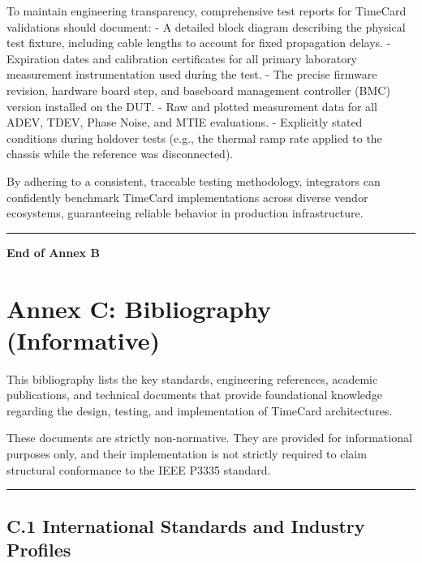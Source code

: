 To maintain engineering transparency, comprehensive test reports for
TimeCard validations should document: - A detailed block diagram
describing the physical test fixture, including cable lengths to account
for fixed propagation delays. - Expiration dates and calibration
certificates for all primary laboratory measurement instrumentation used
during the test. - The precise firmware revision, hardware board step,
and baseboard management controller (BMC) version installed on the DUT.
- Raw and plotted measurement data for all ADEV, TDEV, Phase Noise, and
MTIE evaluations. - Explicitly stated conditions during holdover tests
(e.g., the thermal ramp rate applied to the chassis while the reference
was disconnected).

By adhering to a consistent, traceable testing methodology, integrators
can confidently benchmark TimeCard implementations across diverse vendor
ecosystems, guaranteeing reliable behavior in production infrastructure.

\begin{center}\rule{0.5\linewidth}{0.5pt}\end{center}

\textbf{End of Annex B}

\section{Annex C: Bibliography
(Informative)}\label{annex-c-bibliography-informative}

This bibliography lists the key standards, engineering references,
academic publications, and technical documents that provide foundational
knowledge regarding the design, testing, and implementation of TimeCard
architectures.

These documents are strictly non-normative. They are provided for
informational purposes only, and their implementation is not strictly
required to claim structural conformance to the IEEE P3335 standard.

\begin{center}\rule{0.5\linewidth}{0.5pt}\end{center}

\subsection{C.1 International Standards and Industry
Profiles}\label{c.1-international-standards-and-industry-profiles}

